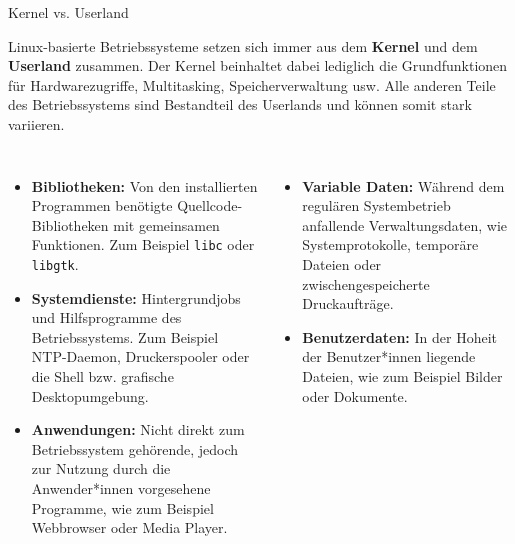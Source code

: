 {
\footnotesize
\setlength{\leftmargini}{1.2em}

\begin{frame}{Kernel vs. Userland}
    \parbox{\linewidth}{
        Linux-basierte Betriebssysteme setzen sich immer aus dem \textbf{Kernel}
        und dem \textbf{Userland} zusammen. Der Kernel beinhaltet dabei lediglich
        die Grundfunktionen für Hardwarezugriffe, Multitasking, Speicherverwaltung
        usw. Alle anderen Teile des Betriebssystems sind Bestandteil des Userlands
        und können somit stark variieren.
    }

    \vfill

    {
        \scriptsize

        \begin{columns}[T,onlytextwidth]
            \begin{itemize}
                \justifying

                \item \textbf{Bibliotheken:} Von den installierten Programmen
                benötigte Quellcode-Bibliotheken mit gemeinsamen Funktionen.
                Zum Beispiel \texttt{libc} oder \texttt{libgtk}.

                \item \textbf{Systemdienste:} Hintergrundjobs und Hilfsprogramme des
                Betriebssystems. Zum Beispiel NTP-Daemon, Druckerspooler oder die
                Shell bzw. grafische Desktopumgebung.

                \item \textbf{Anwendungen:} Nicht direkt zum Betriebssystem gehörende,
                jedoch zur Nutzung durch die Anwender*innen vorgesehene Programme, wie
                zum Beispiel Webbrowser oder Media Player.
            \end{itemize}

            \begin{itemize}
                \justifying

                \item \textbf{Variable Daten:} Während dem regulären Systembetrieb
                anfallende Verwaltungsdaten, wie Systemprotokolle, temporäre Dateien
                oder zwischengespeicherte Druckaufträge.

                \item \textbf{Benutzerdaten:} In der Hoheit der Benutzer*innen liegende
                Dateien, wie zum Beispiel Bilder oder Dokumente.
            \end{itemize}
        \end{columns}
    }


\end{frame}}
